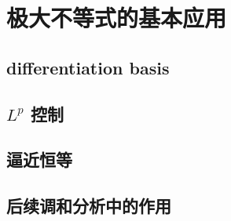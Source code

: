 \section{极大不等式的基本应用}
\label{b1:sec:1304}


\subsection{differentiation basis}
\label{b1:subsec:130401}

\subsection{\texorpdfstring{\(L^p\)}{Lp} 控制}
\label{b1:subsec:130402}

\subsection{逼近恒等}
\label{b1:subsec:130403}

\subsection{后续调和分析中的作用}
\label{b1:subsec:130404}


